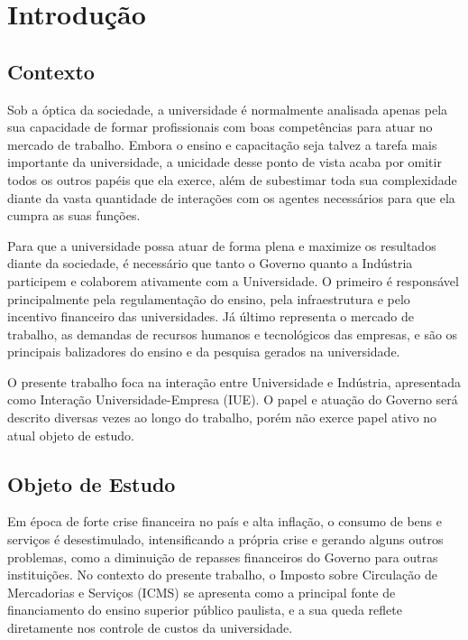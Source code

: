 \chapter[Introdução]{Introdução}
\label{chap:introducao}
\section{Contexto}
\label{cha:contexto}

Sob a óptica da sociedade, a universidade é normalmente analisada apenas pela sua capacidade de formar profissionais com boas competências para atuar no mercado de trabalho. Embora o ensino e capacitação seja talvez a tarefa mais importante da universidade, a unicidade desse ponto de vista acaba por omitir todos os outros papéis que ela exerce, além de subestimar toda sua complexidade diante da vasta quantidade de interações com os agentes necessários para que ela cumpra as suas funções.

Para que a universidade possa atuar de forma plena e maximize os resultados diante da sociedade, é necessário que tanto o Governo quanto a Indústria participem e colaborem ativamente com a Universidade. O primeiro é responsável principalmente pela regulamentação do ensino, pela infraestrutura e pelo incentivo financeiro das universidades. Já último representa o mercado de trabalho, as demandas de recursos humanos e tecnológicos das empresas, e são os principais balizadores do ensino e da pesquisa gerados na universidade.

O presente trabalho foca na interação entre Universidade e Indústria, apresentada como Interação Universidade-Empresa (IUE). O papel e atuação do Governo será descrito diversas vezes ao longo do trabalho, porém não exerce papel ativo no atual objeto de estudo.

\section{Objeto de Estudo}

Em época de forte crise financeira no país e alta inflação, o consumo de bens e serviços é desestimulado, intensificando a própria crise e gerando alguns outros problemas, como a diminuição de repasses financeiros do Governo para outras instituições. No contexto do presente trabalho, o Imposto sobre Circulação de Mercadorias e Serviços (ICMS) se apresenta como a  principal fonte de financiamento do ensino superior público paulista, e a sua queda reflete diretamente nos controle de custos da universidade.

